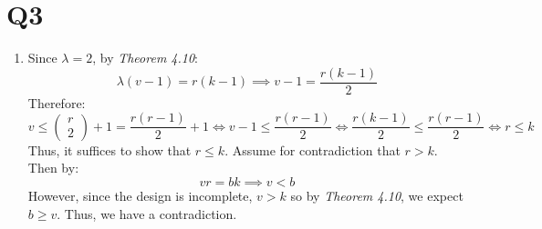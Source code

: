 \documentclass[a4paper, 11pt]{article}
\def\set#1{\left\{ #1 \right\}}
\def\abs#1{\left|#1\right|}
\begin{document}
\pagebreak
\section*{Q3}
\begin{enumerate}[label=(\alph*)]
	\item Since $\lambda=2$, by \textit{Theorem 4.10}: 
	\[
		\lambda(v-1)=r(k-1) \implies v-1=\frac{r(k-1)}2	
	\]
	Therefore:
	\[
		v\leq \begin{pmatrix}
			r \\ 2
		\end{pmatrix} + 1 = \frac{r(r-1)}2 + 1 \iff v-1 \leq \frac{r(r-1)}2  \iff \frac{r(k-1)}2	\leq \frac{r(r-1)}2   \iff r\leq k
	\]
	Thus, it suffices to show that $r\leq k$. Assume for contradiction that $r>k$. Then by: 
	\[vr=bk \implies v<b\]
	However, since the design is incomplete, $v>k$ so by \textit{Theorem 4.10}, we expect $b\geq v$. Thus, we have a contradiction.



	
		
	






\end{enumerate}
\end{document}
